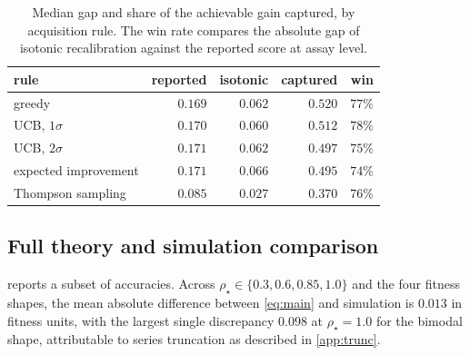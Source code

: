 \documentclass{article}
\theoremstyle{plain}
\theoremstyle{definition}
\begin{document}
\begin{table}[ht]
\caption{Median gap and share of the achievable gain captured, by acquisition rule.
The win rate compares the absolute gap of isotonic recalibration against the reported
score at assay level.}
\label{tab:acq}
\vskip 0.1in
\begin{center}
\begin{small}
\begin{tabular}{lrrrr}
\toprule
rule & reported & isotonic & captured & win \\
\midrule
greedy               & $0.169$ & $0.062$ & $0.520$ & $77\%$ \\
UCB, $1\sigma$       & $0.170$ & $0.060$ & $0.512$ & $78\%$ \\
UCB, $2\sigma$       & $0.171$ & $0.062$ & $0.497$ & $75\%$ \\
expected improvement & $0.171$ & $0.066$ & $0.495$ & $74\%$ \\
Thompson sampling    & $0.085$ & $0.027$ & $0.370$ & $76\%$ \\
\bottomrule
\end{tabular}
\end{small}
\end{center}
\vskip -0.1in
\end{table}

\subsection{Full theory and simulation comparison}
\label{app:fulltheory}

 reports a subset of accuracies. Across $\rho_\star \in \{0.3, 0.6,
0.85, 1.0\}$ and the four fitness shapes, the mean absolute difference between
\cref{eq:main} and simulation is $0.013$ in fitness units, with the largest single
discrepancy $0.098$ at $\rho_\star = 1.0$ for the bimodal shape, attributable to series
truncation as described in \cref{app:trunc}.
\end{document}
